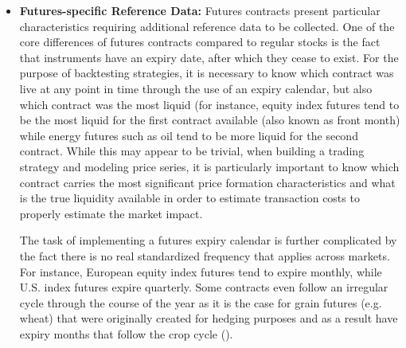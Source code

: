 \begin{itemize}
\item \textbf{Futures-specific Reference Data:} Futures contracts present particular characteristics requiring additional reference data to be collected. One of the core differences of futures contracts compared to regular stocks is the fact that instruments have an expiry date, after which they cease to exist. For the purpose of backtesting strategies, it is necessary to know which contract was live at any point in time through the use of an expiry calendar, but also which contract was the most liquid (for instance, equity index futures tend to be the most liquid for the first contract available (also known as front month) while energy futures such as oil tend to be more liquid for the second contract. While this may appear to be trivial, when building a trading strategy and modeling price series, it is particularly important to know which contract carries the most significant price formation characteristics and what is the true liquidity available in order to estimate transaction costs to properly estimate the market impact. 

The task of implementing a futures expiry calendar is further complicated by the fact there is no real standardized frequency that applies across markets. For instance, European equity index futures tend to expire monthly, while U.S. index futures expire quarterly. Some contracts even follow an irregular cycle through the course of the year as it is the case for grain futures (e.g. wheat) that were originally created for hedging purposes and as a result have expiry months that follow the crop cycle ().


\end{itemize}
